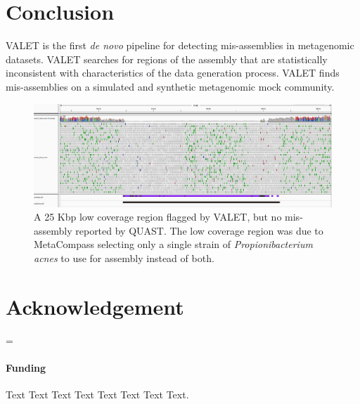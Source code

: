 \documentclass{bioinfo}
\begin{document}
\section{Conclusion}

VALET is the first \emph{de novo} pipeline for detecting mis-assemblies in metagenomic datasets.
VALET searches for regions of the assembly that are statistically inconsistent with characteristics of the data generation process.
VALET finds mis-assemblies on a simulated and synthetic metagenomic mock community.

\begin{figure}[tb!]
\begin{center}
\includegraphics[width=1.4\textheight]{figures/p_acne_1}
\end{center}
\caption[Examining a 25 Kbp region flagged by VALET]{A 25 Kbp low coverage region flagged by VALET, but no mis-assembly reported by QUAST. The low coverage region was due to MetaCompass selecting only a single strain of \emph{Propionibacterium acnes} to use for assembly instead of both.}
\label{fig:p_acnes}
\end{figure}

\section*{Acknowledgement}
=
\paragraph{Funding\textcolon} Text Text Text Text Text Text  Text Text.










\end{document}
